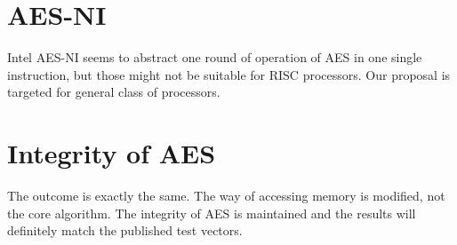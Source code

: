 \documentclass[3p]{elsarticle}
\begin{document}
\section{AES-NI}
Intel AES-NI seems to abstract one round of operation of AES in one single instruction, but those might not be suitable for RISC processors. Our proposal is targeted for general class of processors.

\section{Integrity of AES}
The outcome is exactly the same. The way of accessing memory is modified, not the core algorithm. The integrity of AES is maintained and the results will definitely match the published test vectors.
\end{document}
